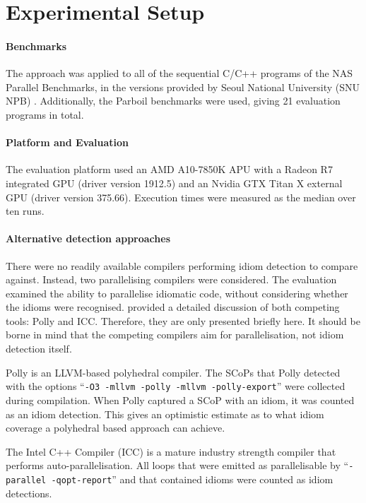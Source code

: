 \section{Experimental Setup}

    \paragraph*{Benchmarks}
    The approach was applied to all of the sequential C/C++ programs of the NAS
    Parallel Benchmarks, in the versions provided by Seoul National University
    (SNU NPB) \citep{seo2011performance}.
    Additionally, the Parboil benchmarks \citep{Stratton2018} were used,
    giving 21 evaluation programs in total. 

    \paragraph*{Platform and Evaluation}
    The evaluation platform used an AMD A10-7850K APU with a Radeon R7
    integrated GPU (driver version 1912.5) and an Nvidia GTX Titan X external
    GPU (driver version 375.66).
    Execution times were measured as the median over ten runs.

    \paragraph*{Alternative detection approaches}
    There were no readily available compilers performing idiom detection to
    compare against.
    Instead, two parallelising compilers were considered.
    The evaluation examined the ability to parallelise idiomatic code, without
    considering whether the idioms were recognised.
     provided a detailed discussion of both
    competing tools: Polly and ICC.
    Therefore, they are only presented briefly here.
    It should be borne in mind that the competing compilers aim for
    parallelisation, not idiom detection itself.

    Polly is an LLVM-based polyhedral compiler.
    The SCoPs that Polly detected with the options
    ``{\tt -O3 -mllvm -polly -mllvm -polly-export}'' were collected during
    compilation.
    When Polly captured a SCoP with an idiom, it was counted as an
    idiom detection.
    This gives an optimistic estimate as to what idiom coverage a polyhedral
    based approach can achieve.

    The Intel C++ Compiler (ICC) is a mature industry strength compiler that
    performs auto-parallelisation.
    All loops that were emitted as parallelisable by
    ``{\tt-parallel -qopt-report}'' and that contained idioms were counted as
    idiom detections.

